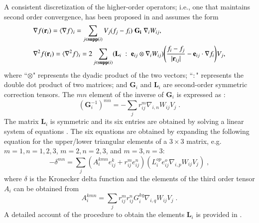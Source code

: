 \documentclass[final,3p,times]{elsarticle}
\begin{document}
A consistent discretization of the higher-order operators; i.e., one that maintains second order convergence, has been proposed in \cite{fatehi2011,randles1996} and assumes the form
 \begin{align}
 &\nabla f(\mathbf r_i)=\langle \nabla f \rangle_i=\sum_{j \in \mathbf{supp}(i)} V_j (f_j-f_i)\; \mathbf{G_i}\; \nabla_i W_{ij},\label{eq:Consistent_G}\\
 &\nabla^2 f(\mathbf r_i)=\langle \nabla^2 f \rangle_i=2\sum_{j \in \mathbf{supp}(i)}  ( \mathbf{L}_i \;:\;  \mathbf{e}_{ij} \otimes \nabla_i W_{ij}) \Bigg( \frac{f_i-f_j}{|\mathbf{r}_{ij}|}  - \mathbf{e}_{ij} \cdot \nabla f_i\Bigg) V_j,\label{eq:Consistent_L}
 \end{align}
 where ``$\otimes$" represents the dyadic product of the two vectors; ``$:$" represents the double dot product of two matrices; and $\mathbf{G}_i$ and $\mathbf{L}_i$ are  second-order symmetric correction tensors. The  $mn$ element of the inverse of $\mathbf{G}_{i}$ is expressed as \cite{Libersky1993,randles1996,fatehi2011}: 
 \begin{equation}\label{eq:gradient_Gi}
 (\textbf{G}_{i}^{-1})^{mn}=-\sum\limits_j r_{ij}^{m}\nabla_{i,n}W_{ij}V_{j} \;.
 \end{equation}
 The matrix $\mathbf{L}_i$ is symmetric and its six entries are obtained by solving a linear system of equations \cite{fatehi2011}. The six equations are obtained by expanding the following equation for the upper/lower triangular elements of a $3 \times 3 $ matrix, e.g. $m=1,n=1,2,3$,   $m=2,n=2,3$, and $m=3,n=3$:
 \begin{equation}\label{eq:delta_mn}
 -\delta^{mn}=\sum\limits_j(A_{i}^{kmn}e_{ij}^{k}+r_{ij}^{m}e_{ij}^{n})(L_{i}^{op}e_{ij}^{o}\nabla_{i,p}W_{ij}V_{j}) \; ,
 \end{equation}
 where $\delta$ is the Kronecker delta function and the elements of the third order tensor $A_{i}$ can be obtained from 
 \begin{equation}\label{equ:Ai_kmn}
 A_{i}^{kmn}=\sum\limits_j r_{ij}^{m} r_{ij}^{n}G_{i}^{kq}\nabla_{i,q}W_{ij}V_{j} \;.
 \end{equation}
A detailed account of the procedure to obtain the elements $\textbf{L}_i$ is provided in \cite{TR-2016-14}. 
 
\end{document}
